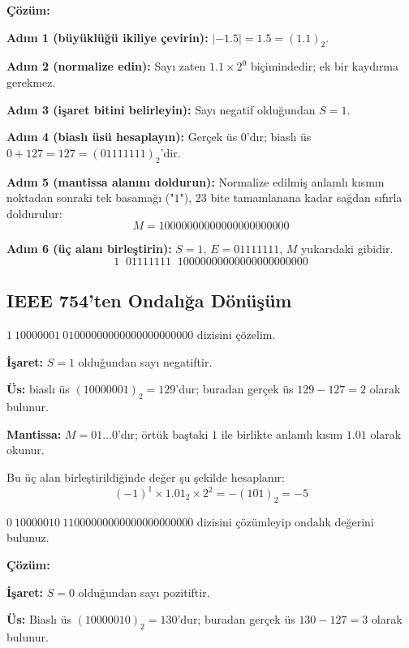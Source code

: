 \noindent\textbf{Çözüm:}

\noindent\textbf{Adım 1 (büyüklüğü ikiliye çevirin):} $|-1.5|=1.5=(1.1)_2$.

\noindent\textbf{Adım 2 (normalize edin):} Sayı zaten $1.1\times2^{0}$ biçimindedir; ek
bir kaydırma gerekmez.

\noindent\textbf{Adım 3 (işaret bitini belirleyin):} Sayı negatif olduğundan $S=1$.

\noindent\textbf{Adım 4 (biaslı üsü hesaplayın):} Gerçek üs $0$'dır; biaslı üs
$0+127=127=(01111111)_2$'dir.

\noindent\textbf{Adım 5 (mantissa alanını doldurun):} Normalize edilmiş anlamlı kısmın
noktadan sonraki tek basamağı ("$1$"), $23$ bite tamamlanana kadar sağdan sıfırla
doldurulur:
\[
M = 10000000000000000000000
\]

\noindent\textbf{Adım 6 (üç alanı birleştirin):} $S=1$, $E=01111111$, $M$ yukarıdaki
gibidir.
\[
1 \;\; 01111111 \;\; 10000000000000000000000
\]

\subsection{IEEE 754'ten Ondalığa Dönüşüm}
\label{sec:ieee754-ondalik}

\begin{ornek}
$1\ 10000001\ 01000000000000000000000$ dizisini çözelim.

\textbf{İşaret:} $S=1$ olduğundan sayı negatiftir.

\textbf{Üs:} biaslı üs $(10000001)_2=129$'dur; buradan gerçek üs $129-127=2$ olarak bulunur.

\textbf{Mantissa:} $M=01\ldots0$'dır; örtük baştaki $1$ ile birlikte anlamlı kısım $1.01$
olarak okunur.

Bu üç alan birleştirildiğinde değer şu şekilde hesaplanır:
\[
(-1)^1\times1.01_2\times2^2 = -(101)_2 = -5
\]
\end{ornek}

\begin{alistirma}[\orta]
$0\ 10000010\ 11000000000000000000000$ dizisini çözümleyip ondalık değerini bulunuz.
\end{alistirma}

\noindent\textbf{Çözüm:}

\noindent\textbf{İşaret:} $S=0$ olduğundan sayı pozitiftir.

\noindent\textbf{Üs:} Biaslı üs $(10000010)_2=130$'dur; buradan gerçek üs $130-127=3$
olarak bulunur.

